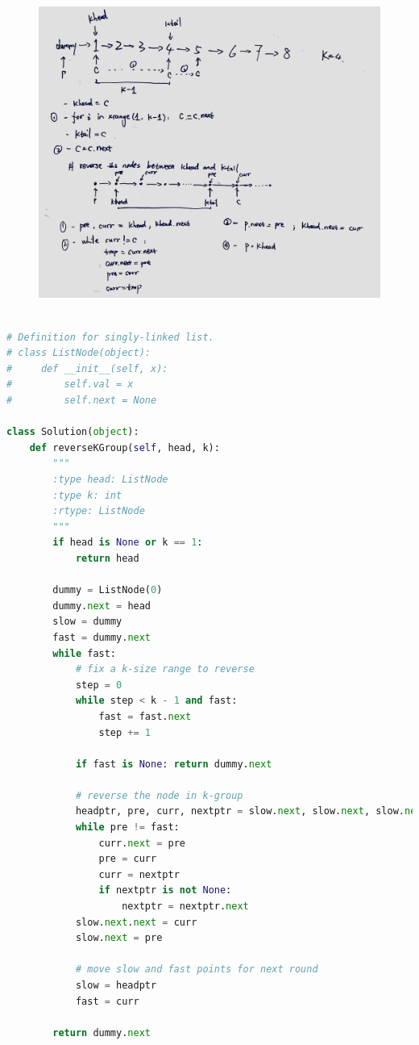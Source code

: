 \documentclass[a4paper,10pt]{article}
\begin{document}
\begin{figure}[h]
    \includegraphics[width=\textwidth]{leetcode25.jpg}
    \centering \\
\end{figure}

\begin{lstlisting}[language=Python, caption=Problem25. Reverse Nodes in k-Group]

# Definition for singly-linked list.
# class ListNode(object):
#     def __init__(self, x):
#         self.val = x
#         self.next = None

class Solution(object):
    def reverseKGroup(self, head, k):
        """
        :type head: ListNode
        :type k: int
        :rtype: ListNode
        """
        if head is None or k == 1:
            return head

        dummy = ListNode(0)
        dummy.next = head
        slow = dummy
        fast = dummy.next
        while fast:
            # fix a k-size range to reverse
            step = 0
            while step < k - 1 and fast:
                fast = fast.next
                step += 1

            if fast is None: return dummy.next

            # reverse the node in k-group
            headptr, pre, curr, nextptr = slow.next, slow.next, slow.next.next, slow.next.next.next
            while pre != fast:
                curr.next = pre
                pre = curr
                curr = nextptr
                if nextptr is not None:
                    nextptr = nextptr.next
            slow.next.next = curr
            slow.next = pre

            # move slow and fast points for next round
            slow = headptr
            fast = curr

        return dummy.next
\end{lstlisting}
\end{document}
